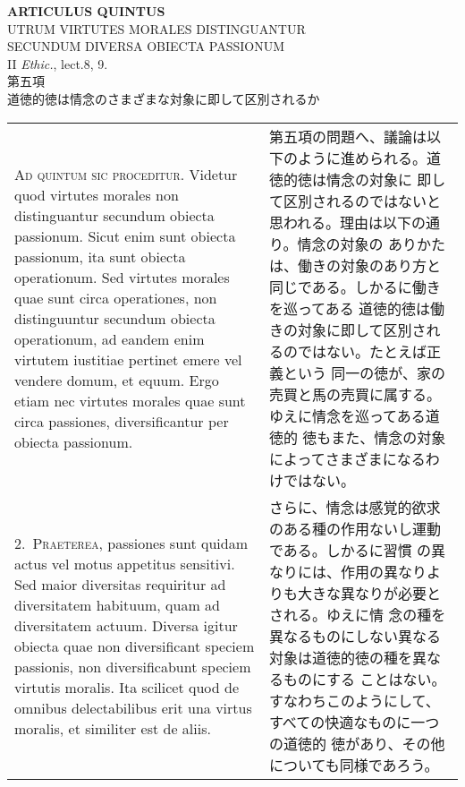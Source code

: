 \documentclass[10pt]{jsarticle}
\begin{document}
\begin{center}
{\Large {\bf ARTICULUS QUINTUS}}\\
{\large UTRUM VIRTUTES MORALES DISTINGUANTUR\\SECUNDUM DIVERSA OBIECTA PASSIONUM}\\
{\footnotesize II {\itshape Ethic.}, lect.8, 9.}\\
{\Large 第五項\\道徳的徳は情念のさまざまな対象に即して区別されるか}
\end{center}

\begin{longtable}{p{21em}p{21em}}

 {\scshape Ad quintum sic proceditur}. Videtur quod virtutes morales
 non distinguantur secundum obiecta passionum. Sicut enim sunt obiecta
 passionum, ita sunt obiecta operationum. Sed virtutes morales quae
 sunt circa operationes, non distinguuntur secundum obiecta
 operationum, ad eandem enim virtutem iustitiae pertinet emere vel
 vendere domum, et equum. Ergo etiam nec virtutes morales quae sunt
 circa passiones, diversificantur per obiecta passionum.

 
 &

 第五項の問題へ、議論は以下のように進められる。道徳的徳は情念の対象に
 即して区別されるのではないと思われる。理由は以下の通り。情念の対象の
 ありかたは、働きの対象のあり方と同じである。しかるに働きを巡ってある
 道徳的徳は働きの対象に即して区別されるのではない。たとえば正義という
 同一の徳が、家の売買と馬の売買に属する。ゆえに情念を巡ってある道徳的
 徳もまた、情念の対象によってさまざまになるわけではない。

\\




2.~{\scshape Praeterea}, passiones sunt quidam actus vel motus
appetitus sensitivi. Sed maior diversitas requiritur ad diversitatem
habituum, quam ad diversitatem actuum. Diversa igitur obiecta quae non
diversificant speciem passionis, non diversificabunt speciem virtutis
moralis. Ita scilicet quod de omnibus delectabilibus erit una virtus
moralis, et similiter est de aliis.
 
&

 さらに、情念は感覚的欲求のある種の作用ないし運動である。しかるに習慣
 の異なりには、作用の異なりよりも大きな異なりが必要とされる。ゆえに情
 念の種を異なるものにしない異なる対象は道徳的徳の種を異なるものにする
 ことはない。すなわちこのようにして、すべての快適なものに一つの道徳的
 徳があり、その他についても同様であろう。
 

\end{longtable}
\end{document}
